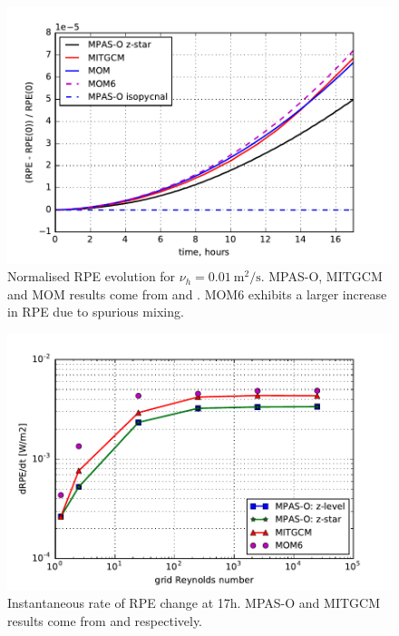 \begin{figure}
  \includegraphics{../plots/lock_exchange_rpe_norm.pdf}
  \caption{\label{fig:lock-rpenorm} Normalised RPE evolution for $\nu_h = \SI{0.01}{\square\metre\per\second}$. MPAS-O, MITGCM and MOM results come from \citet{petersen15} and \citet{ilicak12}. MOM6 exhibits a larger increase in RPE due to spurious mixing.}
\end{figure}


\begin{figure}
  \includegraphics{../plots/lock_exchange_drpe.pdf}
  \caption{\label{fig:lock-drpe} Instantaneous rate of RPE change at 17h. MPAS-O and MITGCM results come from \citet{petersen15} and \citet{ilicak12} respectively.}
\end{figure}


